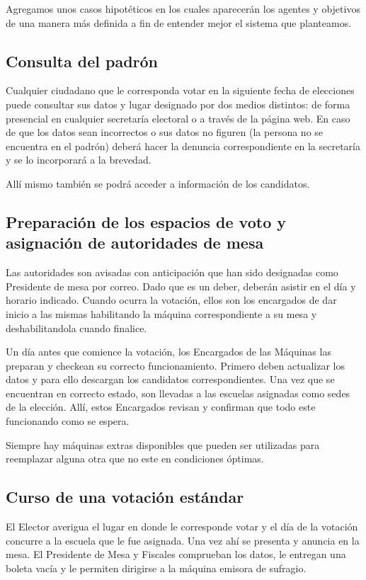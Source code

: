 \documentclass[spanish, 10pt,a4paper]{article}
\numberwithin{equation}{section} %
\begin{document}
Agregamos unos casos hipotéticos en los cuales aparecerán los agentes y objetivos de una manera más definida a fin de entender mejor el sistema que planteamos.

\subsection{Consulta del padrón}
	Cualquier ciudadano que le corresponda votar en la siguiente fecha de elecciones puede consultar sus datos y lugar designado por dos medios distintos: de forma presencial en cualquier secretaría electoral o a través de la página web. En caso de que los datos sean incorrectos o sus datos no figuren (la persona no se encuentra en el padrón) deberá hacer la denuncia correspondiente en la secretaría y se lo incorporará a la brevedad.
	
	Allí mismo también se podrá acceder a información de los candidatos.

\subsection{Preparación de los espacios de voto y asignación de autoridades de mesa}
	Las autoridades son avisadas con anticipación que han sido designadas como Presidente de mesa por correo. Dado que es un deber, deberán asistir en el día y horario indicado. Cuando ocurra la votación, ellos son los encargados de dar inicio a las mismas habilitando la máquina correspondiente a su mesa y deshabilitandola cuando finalice.		
	
	Un día antes que comience la votación, los Encargados de las Máquinas las preparan y checkean su correcto funcionamiento. Primero deben actualizar los datos y para ello descargan los candidatos correspondientes. Una vez que se encuentran en correcto estado, son llevadas a las escuelas asignadas como sedes de la elección. Allí, estos Encargados revisan y confirman que todo este funcionando como se espera. 
	
	Siempre hay máquinas extras disponibles que pueden ser utilizadas para reemplazar alguna otra que no este en condiciones óptimas.
	

\subsection{Curso de una votación estándar}
	El Elector averigua el lugar en donde le corresponde votar y el día de la votación concurre a la escuela que le fue asignada. Una vez ahí se presenta y anuncia en la mesa. El Presidente de Mesa y Fiscales comprueban los datos, le entregan una boleta vacía y le permiten dirigirse a la máquina emisora de sufragio. 
\end{document}
